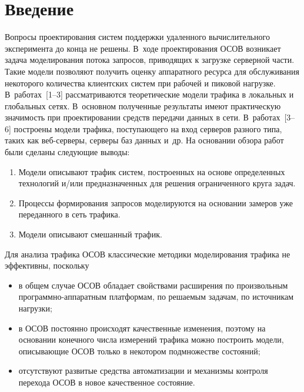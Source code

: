       \begin{multicols}{2}

            \label{st\stat}
  
\section{Введение}
  
  Вопросы проектирования систем поддержки удаленного вычислительного 
эксперимента до \mbox{конца} не решены. В~ходе проектирования ОСОВ 
возникает задача моделирования потока запросов, 
приводящих к загрузке серверной части. Такие модели позволяют получить 
оценку аппаратного ресурса для обслуживания некоторого количества клиентских 
систем при рабочей и пиковой нагрузке. В~работах~[1--3] 
рассматриваются теоретические модели трафика в локальных и глобальных сетях. 
В~основном полученные результаты имеют практическую значимость при 
проектировании средств передачи данных в сети. В~работах~[3--6] 
построены модели трафика, поступающего на вход серверов разного типа, 
таких как веб-серверы, серверы баз данных и~др. На основании обзора работ 
были сделаны следующие выводы:
\begin{enumerate}[1.]
\item Модели описывают трафик систем, построенных на основе определенных 
технологий и/или предназначенных для решения ограниченного круга задач.
\item Процессы формирования запросов моделируются на основании замеров уже 
переданного в сеть трафика.
\item Модели описывают смешанный трафик. 
\end{enumerate}

  Для анализа трафика ОСОВ классические 
методики моделирования трафика не эффективны, поскольку
  \begin{itemize} %
\item в общем случае ОСОВ обладает свойствами расширения по произвольным 
программно-ап\-па\-рат\-ным платформам, по решаемым задачам, по источникам 
нагрузки; 
\item в ОСОВ постоянно происходят качественные изменения, поэтому на 
основании конечного числа измерений трафика можно построить модели, 
описывающие ОСОВ только в некотором подмножестве состояний;
\item отсутствуют развитые средства автоматизации и механизмы контроля 
перехода ОСОВ в новое качественное состояние.
\end{itemize}


\end{multicols}
